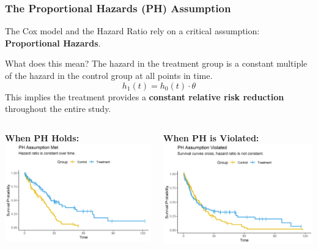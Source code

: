 \documentclass{beamer}
\begin{document}
\begin{frame}
\frametitle{The Proportional Hazards (PH) Assumption}
The Cox model and the Hazard Ratio rely on a critical assumption: \textbf{Proportional Hazards}.

\begin{block}{What does this mean?}
The hazard in the treatment group is a constant multiple of the hazard in the control group at all points in time.
$$h_1(t) = h_0(t) \cdot \theta$$
This implies the treatment provides a \textbf{constant relative risk reduction} throughout the entire study.
\end{block}

\begin{columns}
\begin{column}{0.5\textwidth}
    \textbf{When PH Holds:}
    \includegraphics[width=\textwidth]{images/ph_assumption_met.png}
\end{column}
\begin{column}{0.5\textwidth}
    \textbf{When PH is Violated:}
    \includegraphics[width=\textwidth]{images/ph_assumption_violated.png}
\end{column}
\end{columns}
\end{frame}
\end{document}

